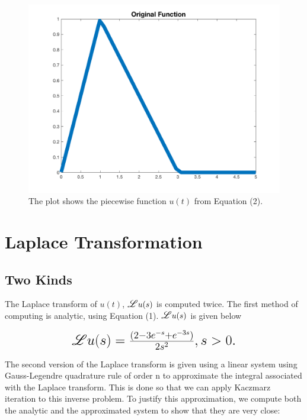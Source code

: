 \documentclass{article}
\newcommand\Laplace{\mathlarger{\mathlarger{\mathscr{L}}}}
\begin{document}
\begin{figure}[H]
    \centerline{
    \includegraphics[height = 10 cm]{Piecewise.png}
    }
    \caption{\label{fig:Piecewise}The plot shows the piecewise function $u(t)$ from Equation (2).}
    
\end{figure}

\section{Laplace Transformation}

\subsection{Two Kinds}

The Laplace transform of $u(t)$, $\Laplace{u(s)}$ is computed twice. The first method of computing is analytic, using Equation (1). $\Laplace{u(s)}$ is given below

\begin{equation}
\mbox{\fontsize{17}{21.6}\(
\mathscr{L} u(s) = \frac{(2 - 3e^{-s} + e^{-3s})}{2s^{2}},   s > 0.
\)}
\end{equation}
 
 
The second version of the Laplace transform is given using a linear system using Gauss-Legendre quadrature rule of order n to approximate the integral associated with the Laplace transform. This is done so that we can apply Kaczmarz iteration to this inverse problem. To justify this approximation, we compute both the analytic and the approximated system to show that they are very close:
\end{document}
